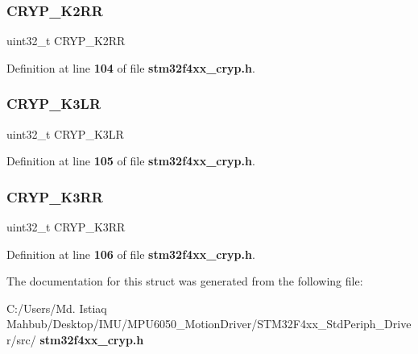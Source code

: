 \subsubsection{C\+R\+Y\+P\+\_\+\+K2\+RR}
{\footnotesize\ttfamily uint32\+\_\+t C\+R\+Y\+P\+\_\+\+K2\+RR}



Definition at line \textbf{ 104} of file \textbf{ stm32f4xx\+\_\+cryp.\+h}.

\mbox{\label{structCRYP__Context_ae354e61155f2a1fb93d490329a393b76}} 
\subsubsection{C\+R\+Y\+P\+\_\+\+K3\+LR}
{\footnotesize\ttfamily uint32\+\_\+t C\+R\+Y\+P\+\_\+\+K3\+LR}



Definition at line \textbf{ 105} of file \textbf{ stm32f4xx\+\_\+cryp.\+h}.

\mbox{\label{structCRYP__Context_a078711953a6ee25f90d81fd86d92a9c2}} 
\subsubsection{C\+R\+Y\+P\+\_\+\+K3\+RR}
{\footnotesize\ttfamily uint32\+\_\+t C\+R\+Y\+P\+\_\+\+K3\+RR}



Definition at line \textbf{ 106} of file \textbf{ stm32f4xx\+\_\+cryp.\+h}.



The documentation for this struct was generated from the following file\+:\begin{DoxyCompactItemize}
\item 
C\+:/\+Users/\+Md. Istiaq Mahbub/\+Desktop/\+I\+M\+U/\+M\+P\+U6050\+\_\+\+Motion\+Driver/\+S\+T\+M32\+F4xx\+\_\+\+Std\+Periph\+\_\+\+Driver/src/\textbf{ stm32f4xx\+\_\+cryp.\+h}\end{DoxyCompactItemize}

